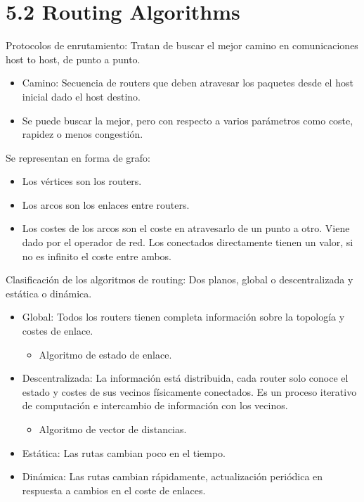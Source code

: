 \documentclass[12pt, twoside, openright]{report} %
\begin{document}
\section{5.2 Routing Algorithms}

Protocolos de enrutamiento: Tratan de buscar el mejor camino en
comunicaciones host to host, de punto a punto.

\begin{itemize}
	\item Camino: Secuencia de routers que deben atravesar los paquetes
	      desde el host inicial dado el host destino.
	\item Se puede buscar la mejor, pero con respecto a varios parámetros
	      como coste, rapidez o menos congestión.
\end{itemize}

Se representan en forma de grafo:

\begin{itemize}
	\item Los vértices son los routers.
	\item Los arcos son los enlaces entre routers.
	\item Los costes de los arcos son el coste en atravesarlo de un punto a
	      otro. Viene dado por el operador de red. Los conectados
	      directamente tienen un valor, si no es infinito el coste entre
	      ambos.
\end{itemize}

Clasificación de los algoritmos de routing: Dos planos, global o
descentralizada y estática o dinámica.

\begin{itemize}
	\item Global: Todos los routers tienen completa información sobre la
	      topología y costes de enlace.

	      \begin{itemize}
		      \item Algoritmo de estado de enlace.
	      \end{itemize}
	\item Descentralizada: La información está distribuida, cada router solo
	      conoce el estado y costes de sus vecinos físicamente conectados.
	      Es un proceso iterativo de computación e intercambio de
	      información con los vecinos.

	      \begin{itemize}
		      \item Algoritmo de vector de distancias.
	      \end{itemize}
	\item Estática: Las rutas cambian poco en el tiempo.
	\item Dinámica: Las rutas cambian rápidamente, actualización periódica
	      en respuesta a cambios en el coste de enlaces.
\end{itemize}
\end{document}
